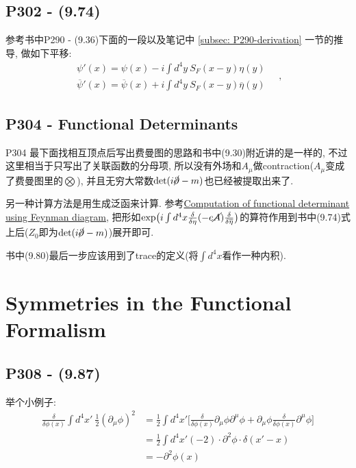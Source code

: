   \subsection{P302 - (9.74)}
  参考书中P290 - (9.36)下面的一段以及笔记中 \ref{subsec: P290-derivation} 一节的推导, 做如下平移:
  \begin{equation}
    \begin{gathered}
      \psi'(x) = \psi(x) - i\int d^4y\ S_F(x-y) \eta(y) \\
      \overline{\psi}'(x) = \overline{\psi}(x) + i\int d^4y\ S_F(x-y) \overline{\eta}(y)
    \end{gathered}\quad,
  \end{equation}

  \subsection{P304 - Functional Determinants}

  P304 最下面找相互顶点后写出费曼图的思路和书中(9.30)附近讲的是一样的, 不过这里相当于只写出了关联函数的分母项, 所以没有外场和$A_\mu$做contraction($A_\mu$变成了费曼图里的$\bigotimes$), 并且无穷大常数$\det(i\cancel{\partial}-m)$也已经被提取出来了.

  另一种计算方法是用生成泛函来计算. 参考\href{https://physics.stackexchange.com/questions/699338/computation-of-functional-determinant-using-feynman-diagram}{Computation of functional determinant using Feynman diagram}, 把形如$\exp\bigl(i\int d^4x \frac{\delta}{\delta \eta}(-e\cancel{A})\frac{\delta}{\delta \overline{\eta}}\bigr)$的算符作用到书中(9.74)式上后($Z_0$即为$\det(i\cancel{\partial}-m)$)展开即可.

  书中(9.80)最后一步应该用到了trace的定义(将$\int d^4x$看作一种内积).

\section{Symmetries in the Functional Formalism}

\subsection{P308 - (9.87)}
举个小例子:
\begin{equation}
  \begin{aligned}
    \frac{\delta}{\delta \phi(x)}\int d^4x'\ \tfrac{1}{2} (\partial_\mu \phi)^2 & = \frac{1}{2} \int d^4x' \biggl[\frac{\delta}{\delta \phi(x)} \partial_\mu \phi \partial^\mu \phi + \partial_\mu \phi \frac{\delta}{\delta \phi(x)} \partial^\mu \phi\biggr] \\
                                                                                & = \frac{1}{2} \int d^4 x' (-2)\cdot \partial^2\phi \cdot \delta(x'-x)                                                                                                        \\
                                                                                & = -\partial^2\phi(x)
  \end{aligned}
\end{equation}

